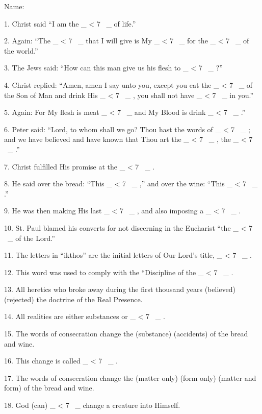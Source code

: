 \documentclass[a5paper]{article}
\title{}
\newcounter{z}
\newcommand\spaces[1]{ \_\loop \ifnum\value{z} < #1
~\_%
\stepcounter{z}%
\repeat%
\setcounter{z}{0}}
\begin{document}
\setlength{\parskip}{6pt plus2pt minus2pt}


\noindent Name:




1. Christ said “I am the \spaces{7} of life.” 

2. Again: “The \spaces{7}  that  I
will give is My \spaces{7} for the \spaces{7} of the world.” 

3. The  Jews  said:
“How can this man give us his flesh to \spaces{7}?” 

4. Christ replied:  “Amen,
amen I say unto you, except you eat the \spaces{7}  of  the  Son  of  Man  and
drink His \spaces{7}, you shall not have \spaces{7} in you.” 

5.  Again:  For  My
flesh is meat \spaces{7} and My Blood  is  drink  \spaces{7}.”  

6.  Peter  said:
“Lord, to whom shall we go? Thou hast the words of  \spaces{7};  and  we  have
believed and have known that  Thou  art  the  \spaces{7},  the  \spaces{7}.” 

7. 
Christ fulfilled His promise at the \spaces{7}. 

8. He  said  over  the  bread:
“This \spaces{7},” and over the wine: “This \spaces{7}.” 

9. He was  then  making
His last \spaces{7}, and also imposing a \spaces{7}. 

10.  St.  Paul  blamed  his
converts for not discerning in the Eucharist “the  \spaces{7}  of  the  Lord.”


11. The letters in “ikthos” are the initial letters  of  Our  Lord's  title,
\spaces{7}. 

12. This word was used to  comply  with  the  “Discipline  of  the
\spaces{7}. 

13. All heretics who broke away during the  first  thousand  years
(believed) (rejected) the doctrine of the Real Presence. 

14.  All  realities
are either substances or \spaces{7}. 

15. The words of consecration change  the
(substance) (accidents) of the bread and wine. 

16.  This  change  is  called
\spaces{7}. 

17. The words of  consecration  change  the  (matter  only)  (form
only) (matter and form) of the  bread  and  wine.  

18.  God  (can)  \spaces{7}
change a creature into Himself. 
\end{document}
